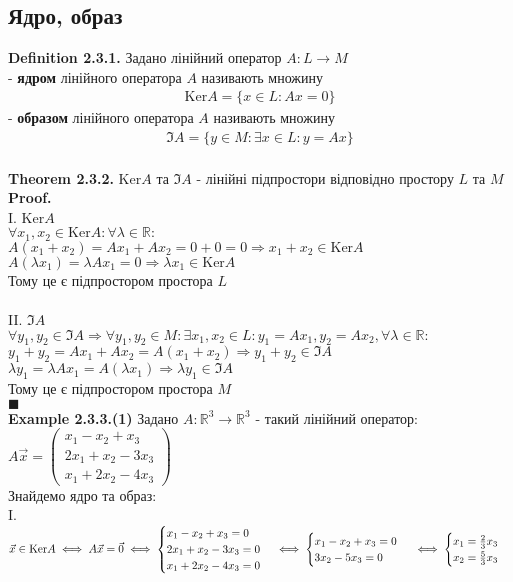 \documentclass[a4paper, 14pt]{extarticle}
\def\defin#1{\textbf{Definition {#1}}}
\def\ex#1{\textbf{Example {#1}}}
\def\th#1{\textbf{Theorem {#1}}}
\def\proof{\textbf{Proof.}\\}
\def\bigline{\vspace{5mm}\\}
\def\qed{$\blacksquare$}
\def\ker#1{\textrm{Ker} {#1}}
\begin{document}
	\subsection{Ядро, образ}
	\defin{2.3.1.} Задано лінійний оператор $A: L \to M$\\
	- \textbf{ядром} лінійного оператора $A$ називають множину
	\begin{align*}
	\textrm{Ker} A = \{x \in L: Ax = 0\}
	\end{align*}
	- \textbf{образом} лінійного оператора $A$ називають множину
	\begin{align*}
	\Im A = \{y \in M: \exists x \in L: y = Ax\}
	\end{align*}
	\\
	\th{2.3.2.} $\textrm{Ker} A$ та $\Im A$ - лінійні підпростори відповідно простору $L$ та $M$\\
	\proof
	I. $\textrm{Ker} A$\\
	$\forall x_1, x_2 \in \textrm{Ker} A: \forall \lambda \in \mathbb{R}:$\\
	$A(x_1+x_2)=Ax_1+Ax_2 = 0 + 0 = 0 \Rightarrow x_1+x_2 \in \textrm{Ker} A$\\
	$A(\lambda x_1) = \lambda Ax_1 = 0 \Rightarrow \lambda x_1 \in \textrm{Ker} A$\\
	Тому це є підпростором простора $L$\\
	\\
	II. $\Im A$\\
	$\forall y_1, y_2 \in \Im A \Rightarrow \forall y_1, y_2 \in M: \exists x_1, x_2 \in L: y_1 = Ax_1, y_2 = Ax_2, \forall \lambda \in \mathbb{R}:$\\
	$y_1 + y_2 = Ax_1 + Ax_2 = A(x_1+x_2) \Rightarrow y_1+y_2 \in \Im A$\\
	$\lambda y_1 = \lambda Ax_1 = A(\lambda x_1) \Rightarrow \lambda y_1 \in \Im A$\\
	Тому це є підпростором простора $M$\\
	\qed
	\bigline
	\ex{2.3.3.(1)} Задано $A: \mathbb{R}^3 \to \mathbb{R}^3$ - такий лінійний оператор:\\
	$A \vec{x} = \begin{pmatrix}
	x_1 - x_2 + x_3 \\
	2x_1 + x_2 - 3x_3 \\
	x_1 + 2x_2 - 4x_3
	\end{pmatrix}$\\
	Знайдемо ядро та образ:\\
	I. $\vec{x} \in \ker A \iff A\vec{x} = \vec{0} \iff \begin{cases} x_1 - x_2 + x_3 = 0 \\ 2x_1 + x_2 - 3x_3 = 0 \\ x_1 + 2x_2 - 4x_3 = 0 \end{cases} \iff \begin{cases} x_1 - x_2 + x_3 = 0 \\ 3x_2 - 5x_3 = 0 \end{cases} \\ \iff \begin{cases} x_1 = \frac{2}{3}x_3 \\ x_2 = \frac{5}{3}x_3 \end{cases}$\\
\end{document}
